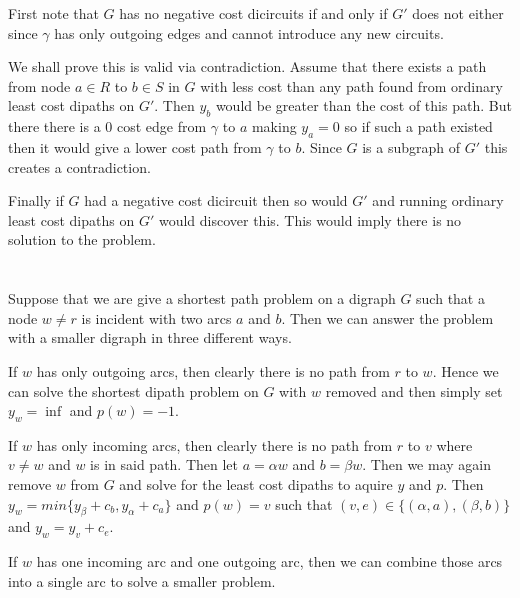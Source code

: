 \documentclass{article}
\begin{document}
First note that $G$ has no negative cost dicircuits if and only if $G'$ does not either since $\gamma$ has only outgoing edges and cannot introduce any new circuits.

We shall prove this is valid via contradiction. Assume that there exists a path from node $a \in R$ to $b \in S$ in $G$ with less cost than any path found from ordinary least cost dipaths on $G'$. Then $y_b$ would be greater than the cost of this path. But there there is a 0 cost edge from $\gamma$ to $a$ making $y_a = 0$ so if such a path existed then it would give a lower cost path from $\gamma$ to $b$. Since $G$ is a subgraph of $G'$ this creates a contradiction. 

Finally if $G$ had a negative cost dicircuit then so would $G'$ and running ordinary least cost dipaths on $G'$ would discover this. This would imply there is no solution to the problem.
 
\section{}
Suppose that we are give a shortest path problem on a digraph $G$ such that a node $w\neq r$ is incident with two arcs $a$ and $b$. Then we can answer the problem with a smaller digraph in three different ways. 

If $w$ has only outgoing arcs, then clearly there is no path from $r$ to $w$. 
Hence we can solve the shortest dipath problem on $G$ with $w$ removed and then simply set $y_w = \inf$ and $p(w) = -1$. 

If $w$ has only incoming arcs, then clearly there is no path from $r$ to $v$ where $v \neq w$ and $w$ is in said path. Then let $a = \alpha w$ and $b = \beta w$. Then we may again remove $w$ from $G$ and solve for the least cost dipaths to aquire $y$ and $p$. 
Then $y_w = min \{ y_\beta + c_b, y_\alpha + c_a\} $ and
$p(w) = v$ such that $(v,e) \in \{(\alpha,a), (\beta,b)\}$ and $y_w = y_v + c_e$.

If $w$ has one incoming arc and one outgoing arc, then we can combine those arcs into a single arc to solve a smaller problem.
\end{document}
